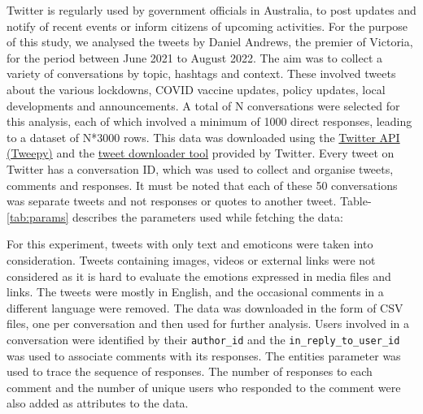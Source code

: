 \documentclass[acmtog]{acmart}
\begin{document}
Twitter is regularly used by government officials in Australia, to post updates and notify of recent events or inform citizens of upcoming activities. For the purpose of this study, we analysed the tweets by Daniel Andrews, the premier of Victoria, for the period between June 2021 to August 2022. The aim was to collect a variety of conversations by topic, hashtags and context. These involved tweets about the various lockdowns, COVID vaccine updates, policy updates, local developments and announcements. A total of N conversations were selected for this analysis, each of which involved a minimum of 1000 direct responses, leading to a dataset of N*3000 rows. This data was downloaded using the \href{https://developer.twitter.com/en/docs/twitter-api}{Twitter API (Tweepy)} and the \href{https://developer.twitter.com/apitools/downloader}{tweet downloader tool} provided by Twitter. Every tweet on Twitter has a conversation ID, which was used to collect and organise tweets, comments and responses. It must be noted that each of these 50 conversations was separate tweets and not responses or quotes to another tweet. Table- \ref{tab:params} describes the parameters used while fetching the data:


For this experiment, tweets with only text and emoticons were taken into consideration. Tweets containing images, videos or external links were not considered as it is hard to evaluate the emotions expressed in media files and links. The tweets were mostly in English, and the occasional comments in a different language were removed. The data was downloaded in the form of CSV files, one per conversation and then used for further analysis. Users involved in a conversation were identified by their \texttt{author\_id} and the \texttt{in\_reply\_to\_user\_id} was used to associate comments with its responses. The entities parameter was used to trace the sequence of responses. The number of responses to each comment and the number of unique users who responded to the comment were also added as attributes to the data. 
\end{document}
